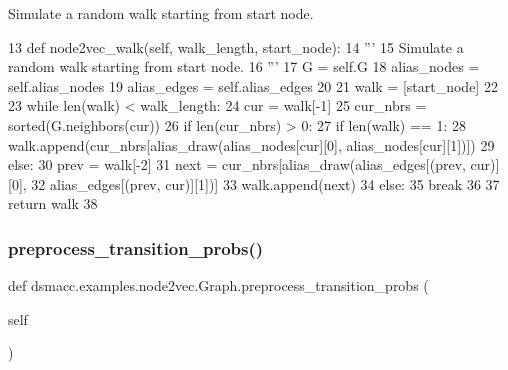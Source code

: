 \begin{DoxyVerb}Simulate a random walk starting from start node.
\end{DoxyVerb}
 
\begin{DoxyCode}
13     \textcolor{keyword}{def }node2vec\_walk(self, walk\_length, start\_node):
14         \textcolor{stringliteral}{'''}
15 \textcolor{stringliteral}{        Simulate a random walk starting from start node.}
16 \textcolor{stringliteral}{        '''}
17         G = self.G
18         alias\_nodes = self.alias\_nodes
19         alias\_edges = self.alias\_edges
20 
21         walk = [start\_node]
22 
23         \textcolor{keywordflow}{while} len(walk) < walk\_length:
24             cur = walk[-1]
25             cur\_nbrs = sorted(G.neighbors(cur))
26             \textcolor{keywordflow}{if} len(cur\_nbrs) > 0:
27                 \textcolor{keywordflow}{if} len(walk) == 1:
28                     walk.append(cur\_nbrs[alias\_draw(alias\_nodes[cur][0], alias\_nodes[cur][1])])
29                 \textcolor{keywordflow}{else}:
30                     prev = walk[-2]
31                     next = cur\_nbrs[alias\_draw(alias\_edges[(prev, cur)][0],
32                         alias\_edges[(prev, cur)][1])]
33                     walk.append(next)
34             \textcolor{keywordflow}{else}:
35                 \textcolor{keywordflow}{break}
36 
37         \textcolor{keywordflow}{return} walk
38 
\end{DoxyCode}
\mbox{\label{classdsmacc_1_1examples_1_1node2vec_1_1Graph_a8ef32284bcdfe5c25333712e2e790c55}} 
\subsubsection{\texorpdfstring{preprocess\+\_\+transition\+\_\+probs()}{preprocess\_transition\_probs()}}
{\footnotesize\ttfamily def dsmacc.\+examples.\+node2vec.\+Graph.\+preprocess\+\_\+transition\+\_\+probs (\begin{DoxyParamCaption}\item[{}]{self }\end{DoxyParamCaption})}

